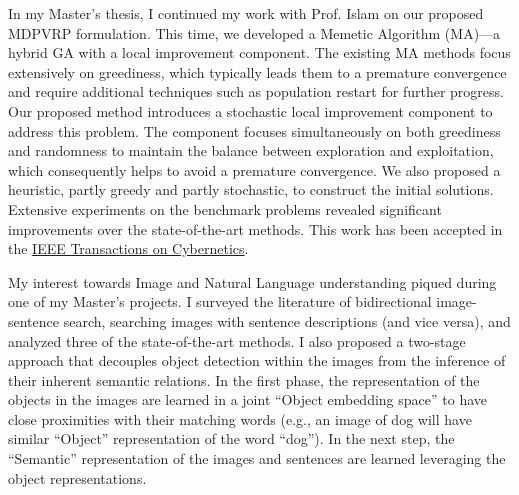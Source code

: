 \documentclass[12pt]{article}
\begin{document}
In my Master's thesis, I continued my work with Prof. Islam on our proposed MDPVRP formulation. This time, we developed a Memetic Algorithm (MA)---a hybrid GA with a local improvement component. The existing MA methods focus extensively on greediness, which typically leads them to a premature convergence and require additional techniques such as population restart for further progress. Our proposed method introduces a stochastic local improvement component to address this problem. The component focuses simultaneously on both greediness and randomness to maintain the balance between exploration and exploitation, which consequently helps to avoid a premature convergence. We also proposed a heuristic, partly greedy and partly stochastic, to construct the initial solutions. Extensive experiments on the benchmark problems revealed significant improvements over the state-of-the-art methods. This work has been accepted in the \href{http://ieeexplore.ieee.org/document/7835722/}{IEEE Transactions on Cybernetics}. 

\begin{comment}
I developed a decent understanding of search techniques and combinatorial optimization during my thesis. To get a greater overview and deeper understanding of the topics of AI \& ML, I have taken a number of related courses during my undergrad and Master's, including AI, ML, Pattern Recognition, and Data Mining. I have also participated in MOOCs on ML (Coursera) and Deep Learning (Udacity). To strengthen my foundation in image analysis, I also took the Advanced Image Processing course. In this course, I learned a number of useful and fundamental techniques, e.g., image enhancement, filtering, segmentation, and compression. I also implemented a paper on content-based image retrieval.
\end{comment}

My interest towards Image and Natural Language understanding piqued during one of my Master's projects. I surveyed the literature of bidirectional image-sentence search, searching images with sentence descriptions (and vice versa), and analyzed three of the state-of-the-art methods. I also proposed a two-stage approach that decouples object detection within the images from the inference of their inherent semantic relations. In the first phase, the representation of the objects in the images are learned in a joint ``Object embedding space'' to have close proximities with their matching words (e.g., an image of dog will have similar ``Object'' representation of the word ``dog''). In the next step, the ``Semantic'' representation of the images and sentences are learned leveraging the object representations. 
\end{document}
